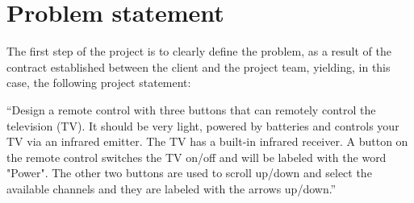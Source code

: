 \section{Problem statement}
\label{sec:prob-stat}
The first step of the project is to clearly define the problem, as a result of
the contract established between the client and the project team, yielding, in
this case, the following project statement:

``Design a remote control with three buttons that can
remotely control the television (TV). It should be very
light, powered by batteries and controls your TV via an
infrared emitter. The TV has a built-in infrared receiver. A
button on the remote control switches the TV on/off and
will be labeled with the word "Power". The other two
buttons are used to scroll up/down and select the available
channels and they are labeled with the arrows up/down.''
